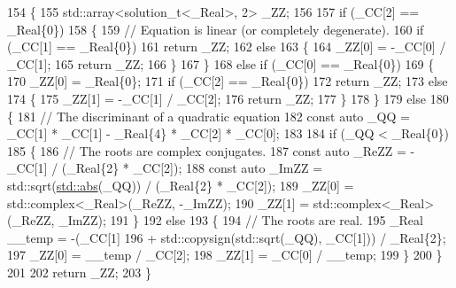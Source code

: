 \begin{DoxyCode}
154     \{
155       std::array<solution\_t<\_Real>, 2> \_ZZ;
156 
157       \textcolor{keywordflow}{if} (\_CC[2] == \_Real\{0\})
158         \{
159           \textcolor{comment}{// Equation is linear (or completely degenerate).}
160           \textcolor{keywordflow}{if} (\_CC[1] == \_Real\{0\})
161             \textcolor{keywordflow}{return} \_ZZ;
162           \textcolor{keywordflow}{else}
163             \{
164               \_ZZ[0] = -\_CC[0] / \_CC[1];
165               \textcolor{keywordflow}{return} \_ZZ;
166             \}
167         \}
168       \textcolor{keywordflow}{else} \textcolor{keywordflow}{if} (\_CC[0] == \_Real\{0\})
169         \{
170           \_ZZ[0] = \_Real\{0\};
171           \textcolor{keywordflow}{if} (\_CC[2] == \_Real\{0\})
172             \textcolor{keywordflow}{return} \_ZZ;
173           \textcolor{keywordflow}{else}
174             \{
175               \_ZZ[1] = -\_CC[1] / \_CC[2];
176               \textcolor{keywordflow}{return} \_ZZ;
177             \}
178         \}
179       \textcolor{keywordflow}{else}
180         \{
181           \textcolor{comment}{// The discriminant of a quadratic equation}
182           \textcolor{keyword}{const} \textcolor{keyword}{auto} \_QQ = \_CC[1] * \_CC[1] - \_Real\{4\} * \_CC[2] * \_CC[0];
183 
184           \textcolor{keywordflow}{if} (\_QQ < \_Real\{0\})
185             \{
186               \textcolor{comment}{// The roots are complex conjugates.}
187               \textcolor{keyword}{const} \textcolor{keyword}{auto} \_ReZZ = -\_CC[1] / (\_Real\{2\} * \_CC[2]);
188               \textcolor{keyword}{const} \textcolor{keyword}{auto} \_ImZZ = std::sqrt(\hyperlink{namespace____gnu__cxx_ab9eb9db3560f504f8cd25a71bcb6ead5}{std::abs}(\_QQ)) / (\_Real\{2\} * \_CC[2]);
189               \_ZZ[0] = std::complex<\_Real>(\_ReZZ, -\_ImZZ);
190               \_ZZ[1] = std::complex<\_Real>(\_ReZZ, \_ImZZ);
191             \}
192           \textcolor{keywordflow}{else}
193             \{
194               \textcolor{comment}{// The roots are real.}
195               \_Real \_\_temp = -(\_CC[1]
196                         + std::copysign(std::sqrt(\_QQ), \_CC[1])) / \_Real\{2\};
197               \_ZZ[0] = \_\_temp / \_CC[2];
198               \_ZZ[1] = \_CC[0] / \_\_temp;
199             \}
200         \}
201 
202       \textcolor{keywordflow}{return} \_ZZ;
203     \}
\end{DoxyCode}
\mbox{\label{namespace____gnu__cxx_af7f59d18caa0bf264f591103478ebcb2}} 
